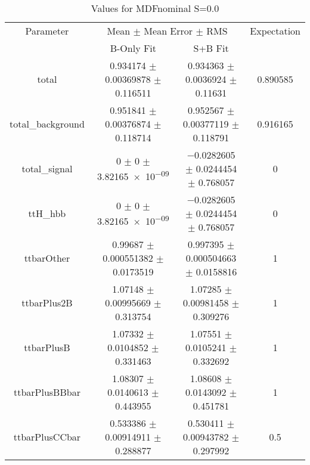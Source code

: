 \begin{table}
\centering
\caption{Values for MDFnominal S=0.0}
\begin{tabular}{cccc}
\toprule
Parameter & \multicolumn{2}{c}{Mean $\pm$ Mean Error $\pm$ RMS} & Expectation\\
 & B-Only Fit & S+B Fit & \\
\midrule
total & \num{0.934174} $\pm$ \num{0.00369878} $\pm$ \num{0.116511} & \num{0.934363} $\pm$ \num{0.0036924} $\pm$ \num{0.11631} & \num{0.890585}\\
total\_background & \num{0.951841} $\pm$ \num{0.00376874} $\pm$ \num{0.118714} & \num{0.952567} $\pm$ \num{0.00377119} $\pm$ \num{0.118791} & \num{0.916165}\\
total\_signal & \num{0} $\pm$ \num{0} $\pm$ \num{3.82165e-09} & \num{-0.0282605} $\pm$ \num{0.0244454} $\pm$ \num{0.768057} & \num{0}\\
ttH\_hbb & \num{0} $\pm$ \num{0} $\pm$ \num{3.82165e-09} & \num{-0.0282605} $\pm$ \num{0.0244454} $\pm$ \num{0.768057} & \num{0}\\
ttbarOther & \num{0.99687} $\pm$ \num{0.000551382} $\pm$ \num{0.0173519} & \num{0.997395} $\pm$ \num{0.000504663} $\pm$ \num{0.0158816} & \num{1}\\
ttbarPlus2B & \num{1.07148} $\pm$ \num{0.00995669} $\pm$ \num{0.313754} & \num{1.07285} $\pm$ \num{0.00981458} $\pm$ \num{0.309276} & \num{1}\\
ttbarPlusB & \num{1.07332} $\pm$ \num{0.0104852} $\pm$ \num{0.331463} & \num{1.07551} $\pm$ \num{0.0105241} $\pm$ \num{0.332692} & \num{1}\\
ttbarPlusBBbar & \num{1.08307} $\pm$ \num{0.0140613} $\pm$ \num{0.443955} & \num{1.08608} $\pm$ \num{0.0143092} $\pm$ \num{0.451781} & \num{1}\\
ttbarPlusCCbar & \num{0.533386} $\pm$ \num{0.00914911} $\pm$ \num{0.288877} & \num{0.530411} $\pm$ \num{0.00943782} $\pm$ \num{0.297992} & \num{0.5}\\
\bottomrule
\end{tabular}
\end{table}